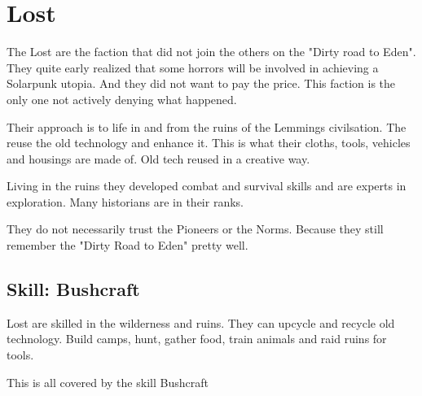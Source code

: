 \section{Lost}

The Lost are the faction that did not join the others on the "Dirty road to Eden". They quite early realized that some horrors will be involved in achieving a Solarpunk utopia. And they did not want to pay the price. This faction is the only one not actively denying what happened.

Their approach is to life in and from the ruins of the Lemmings civilsation. The reuse the old technology and enhance it. This is what their cloths, tools, vehicles and housings are made of. Old tech reused in a creative way.

Living in the ruins they developed combat and survival skills and are experts in exploration.
Many historians are in their ranks.

They do not necessarily trust the Pioneers or the Norms. Because they still remember the "Dirty Road to Eden" pretty well.

\subsection{Skill: Bushcraft}

Lost are skilled in the wilderness and ruins. They can upcycle and recycle old technology. Build camps, hunt, gather food, train animals and raid ruins for tools.

This is all covered by the skill Bushcraft